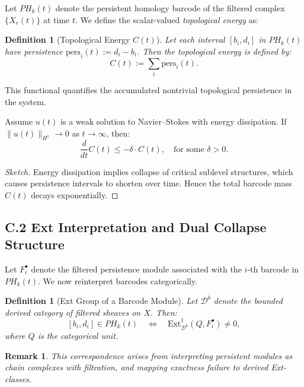 \documentclass[11pt]{article}
\newtheorem{definition}[theorem]{Definition}
\newtheorem{remark}[theorem]{Remark}
\begin{document}
Let $PH_k(t)$ denote the persistent homology barcode of the filtered complex $\{X_r(t)\}$ at time $t$.  
We define the scalar-valued \emph{topological energy} as:

\begin{definition}[Topological Energy $C(t)$]
Let each interval $[b_i, d_i]$ in $PH_k(t)$ have persistence $\text{pers}_i(t) := d_i - b_i$.  
Then the topological energy is defined by:
\[
C(t) := \sum_i \text{pers}_i(t).
\]
\end{definition}

This functional quantifies the accumulated nontrivial topological persistence in the system.

\begin{lemma}
Assume $u(t)$ is a weak solution to Navier--Stokes with energy dissipation.  
If $\|u(t)\|_{H^1} \to 0$ as $t \to \infty$, then:
\[
\frac{d}{dt} C(t) \leq -\delta \cdot C(t), \quad \text{for some } \delta > 0.
\]
\end{lemma}

\begin{proof}[Sketch]
Energy dissipation implies collapse of critical sublevel structures, which causes persistence intervals to shorten over time.  
Hence the total barcode mass $C(t)$ decays exponentially.
\end{proof}

\subsection*{C.2 Ext Interpretation and Dual Collapse Structure}

Let $F^\bullet_i$ denote the filtered persistence module associated with the $i$-th barcode in $PH_k(t)$.  
We now reinterpret barcodes categorically.

\begin{definition}[Ext Group of a Barcode Module]
Let $\mathcal{D}^b$ denote the bounded derived category of filtered sheaves on $X$.  
Then:
\[
[b_i, d_i] \in PH_k(t) \quad \Longleftrightarrow \quad \mathrm{Ext}^1_{\mathcal{D}^b}(Q, F^\bullet_i) \neq 0,
\]
where $Q$ is the categorical unit.
\end{definition}

\begin{remark}
This correspondence arises from interpreting persistent modules as chain complexes with filtration, and mapping exactness failure to derived Ext-classes.
\end{remark}
\end{document}
